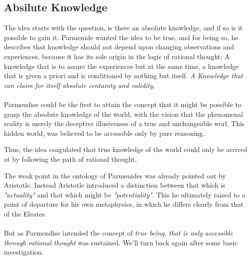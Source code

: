 \documentclass[10pt,a4paper]{article}
\begin{document}
                \subsection{Absilute Knowledge} The idea starts with the question, is there an absolute knowledge, and if so is it possible to gain it. Parmenide wanted the idea to be true, and for being so, he describes that knowledge should not depend upon changing observations and experiences, because it has its sole origin in the logic of rational thought; A knowledge that is to assure the experiences but at the same time, a knowledge that is given a priori and is conditioned by nothing but itself. \textit{A Knowledge that can claim for itself absolute centainty and validity.}
                \\
                \\
                Parmendise could be the first to attain the concept that it might be possible to grasp the absolute knowledge of the world, with the vision that the phenomenal reality is merely the deceptive illusiveness of a true and unchangeable worl. This hidden world, was believed to be accessible only by pure reasoning.
                \begin{qt}
                    Thus, the idea coagulated that true knowledge of the world could only be arrived at by following the path of rational thought,
                \end{qt}
                The weak point in the ontology of Parmenides was already pointed out by Aristotle. Instead Aristotle introduced a distinction between that which is \textit{"actuality"} and that which might be \textit{"potentiality"}. This he ultimately raised to a point of departure for his own metaphysics, in which he differs clearly from that of the Eleates.
                \\
                \\
                But as Parmendise intended the concept of \textit{true being, that is only accessible through rational thought} was sustained. We'll turn back again after some basic investigation.\cite{Kuppers2018-vv}
    
\end{document}
